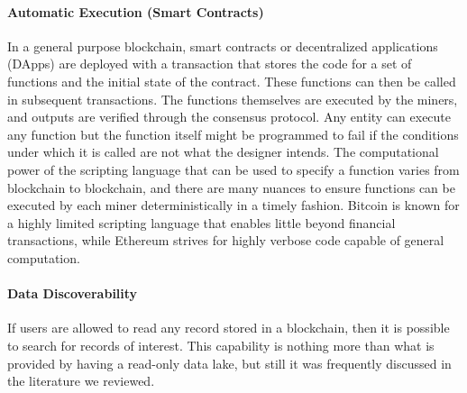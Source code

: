 \paragraph{Automatic Execution (Smart Contracts)}
In a general purpose blockchain, smart contracts or decentralized applications (DApps) are deployed with a transaction that stores the code for a set of functions and the initial state of the contract. These functions can then be called in subsequent transactions. The functions themselves are executed by the miners, and outputs are verified through the consensus protocol. Any entity can execute any function but the function itself might be programmed to fail if the conditions under which it is called are not what the designer intends. The computational power of the scripting language that can be used to specify a function varies from blockchain to blockchain, and there are  many nuances to ensure functions can be executed by each miner deterministically in a timely fashion. Bitcoin is known for a highly limited scripting language that enables little beyond financial transactions, while Ethereum strives for highly verbose code capable of general computation.


\paragraph{Data Discoverability}
If users are allowed to read any record stored in a blockchain, then it is possible to search for records of interest.
This capability is nothing more than what is provided by having a read-only data lake, but still it was frequently discussed in the literature we reviewed.